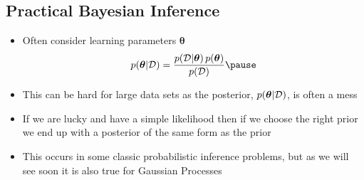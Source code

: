 \begin{slide}
\section{Practical Bayesian Inference}
 
\begin{PauseHighLight}
  \begin{itemize}
  \item Often consider learning parameters $\bm{\theta}$
    \begin{align*}
      p(\bm{\theta}|\data) =
      \frac{p(\data|\bm{\theta})\,p(\bm{\theta})}{p(\data)}\pause
    \end{align*}
  \item This can be hard for large data sets as the posterior,
    $p(\bm{\theta}|\mathcal{D})$, is often a mess\pause
  \item If we are lucky and have a simple likelihood then if we choose
    the right prior we end up with a posterior of the same form as the
    prior\pause
  \item This occurs in some classic probabilistic inference problems,
    but as we will see soon it is also true for Gaussian Processes\pause
  \end{itemize}
\end{PauseHighLight}

\end{slide}



\Outline %

